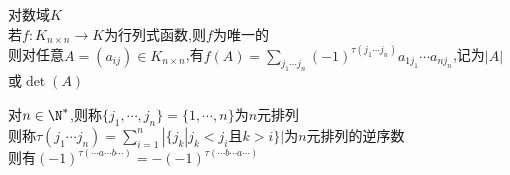 \begin{dingli}
对数域$K$\\
若$f:K_{n\times n}\to K$为行列式函数,则$f$为唯一的\\
则对任意$A=(a_{ij})\in K_{n\times n}$,有$f(A)=\sum\limits_{j_1\cdots j_n}(-1)^{\tau(j_1\cdots j_n)}a_{1j_1}\cdots a_{nj_n}$,记为$|A|$或$\det(A)$
\end{dingli}

\begin{zhu}
对$n\in\N^*$,则称$\{j_1,\cdots,j_n\}=\{1,\cdots,n\}$为$n$元排列\\
则称$\tau(j_1\cdots j_n)=\sum\limits_{i=1}^{n}|\{j_{k}|j_{k}<j_{i}\text{且}k>i\}|$为$n$元排列的逆序数\\
则有$(-1)^{\tau(\cdots a\cdots b\cdots)}=-(-1)^{\tau(\cdots b\cdots a\cdots)}$
\end{zhu}

